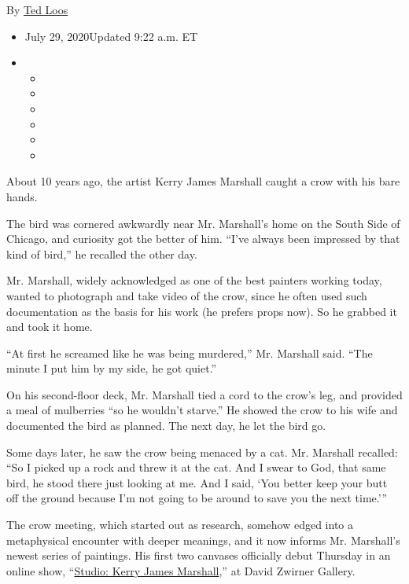 By \href{https://www.nytimes3xbfgragh.onion/by/ted-loos}{Ted Loos}

\begin{itemize}
\item
  July 29, 2020Updated 9:22 a.m. ET
\item
  \begin{itemize}
  \item
  \item
  \item
  \item
  \item
  \item
  \end{itemize}
\end{itemize}

About 10 years ago, the artist Kerry James Marshall caught a crow with
his bare hands.

The bird was cornered awkwardly near Mr. Marshall's home on the South
Side of Chicago, and curiosity got the better of him. ``I've always been
impressed by that kind of bird,'' he recalled the other day.

Mr. Marshall, widely acknowledged as one of the best painters working
today, wanted to photograph and take video of the crow, since he often
used such documentation as the basis for his work (he prefers props
now). So he grabbed it and took it home.

``At first he screamed like he was being murdered,'' Mr. Marshall said.
``The minute I put him by my side, he got quiet.''

On his second-floor deck, Mr. Marshall tied a cord to the crow's leg,
and provided a meal of mulberries ``so he wouldn't starve.'' He showed
the crow to his wife and documented the bird as planned. The next day,
he let the bird go.

Some days later, he saw the crow being menaced by a cat. Mr. Marshall
recalled: ``So I picked up a rock and threw it at the cat. And I swear
to God, that same bird, he stood there just looking at me. And I said,
`You better keep your butt off the ground because I'm not going to be
around to save you the next time.'''

The crow meeting, which started out as research, somehow edged into a
metaphysical encounter with deeper meanings, and it now informs Mr.
Marshall's newest series of paintings. His first two canvases officially
debut Thursday in an online show,
``\href{https://www.davidzwirner.com/viewing-room/studio-kerry-james-marshall}{Studio:
Kerry James Marshall},'' at David Zwirner Gallery.

